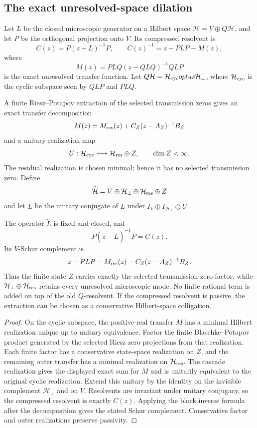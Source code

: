 \subsection{The exact unresolved-space dilation}

Let $L$ be the closed microscopic generator on a Hilbert space
$\mathcal H=V\oplus Q\mathcal H$, and let $P$ be the orthogonal projection onto
$V$.  Its compressed resolvent is
\[
 C(z)=P(z-L)^{-1}P,
 \qquad
 C(z)^{-1}=z-PLP-M(z),
\]
where
\[
 M(z)=PLQ(z-QLQ)^{-1}QLP
\]
is the exact unresolved transfer function.  Let $Q\mathcal H=\mathcal H_{\rm cyc}
oplus\mathcal H_\perp$, where $\mathcal H_{\rm cyc}$ is the cyclic subspace
seen by $QLP$ and $PLQ$.

A finite Riesz--Potapov extraction of the selected transmission zeros gives an
exact transfer decomposition
\[
 M(z)=M_{\rm res}(z)+C_Z(z-A_Z)^{-1}B_Z
\]
and a unitary realization map
\[
 U:\mathcal H_{\rm cyc}\longrightarrow
 \mathcal H_{\rm res}\oplus Z,
 \qquad \dim Z<\infty.
\]
The residual realization is chosen minimal; hence it has no selected
transmission zero.  Define
\[
 \widetilde{\mathcal H}
 =V\oplus\mathcal H_\perp\oplus\mathcal H_{\rm res}\oplus Z
\]
and let $\widetilde L$ be the unitary conjugate of $L$ under
$I_V\oplus I_{\mathcal H_\perp}\oplus U$.

\begin{theorem}
\label{thm:r8-a4-dilation}
The operator $\widetilde L$ is fixed and closed, and
\[
 P(z-\widetilde L)^{-1}P=C(z).
\]
Its $V$-Schur complement is
\[
 z-PLP-M_{\rm res}(z)-C_Z(z-A_Z)^{-1}B_Z.
\]
Thus the finite state $Z$ carries exactly the selected transmission-zero
factor, while $\mathcal H_\perp\oplus\mathcal H_{\rm res}$ retains every
unresolved microscopic mode.  No finite rational term is added on top of the
old $Q$-resolvent.  If the compressed resolvent is passive, the extraction can
be chosen as a conservative Hilbert-space colligation.
\end{theorem}

\begin{proof}
On the cyclic subspace, the positive-real transfer $M$ has a minimal Hilbert
realization unique up to unitary equivalence.  Factor the finite
Blaschke--Potapov product generated by the selected Riesz zero projections from
that realization.  Each finite factor has a conservative state-space
realization on $Z$, and the remaining outer transfer has a minimal realization
on $\mathcal H_{\rm res}$.  The cascade realization gives the displayed exact
sum for $M$ and is unitarily equivalent to the original cyclic realization.
Extend this unitary by the identity on the invisible complement
$\mathcal H_\perp$ and on $V$.  Resolvents are invariant under unitary
conjugacy, so the compressed resolvent is exactly $C(z)$.  Applying the block
inverse formula after the decomposition gives the stated Schur complement.
Conservative factor and outer realizations preserve passivity.
\end{proof}

